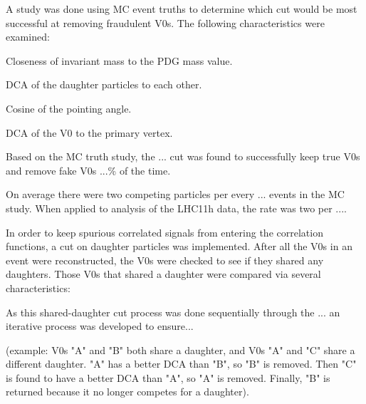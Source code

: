 A study was done using MC event truths to determine which cut would be most successful at removing fraudulent V0s.  The following characteristics were examined:

\item Closeness of invariant mass to the PDG mass value.
\item DCA of the daughter particles to each other.
\item Cosine of the pointing angle.
\item DCA of the V0 to the primary vertex.

Based on the MC truth study, the ... cut was found to successfully keep true V0s and remove fake V0s ...\% of the time.  

On average there were two competing particles per every ... events in the MC study.  When applied to analysis of the LHC11h data, the rate was two per ....

In order to keep spurious correlated signals from entering the correlation functions, a cut on daughter particles was implemented.  After all the V0s in an event were reconstructed, the V0s were checked to see if they shared any daughters.  Those V0s that shared a daughter were compared via several characteristics:

As this shared-daughter cut process was done sequentially through the ... an iterative process was developed to ensure... 

(example: V0s "A" and "B" both share a daughter, and V0s "A" and "C" share a different daughter.  "A" has a better DCA than "B", so "B" is removed.  Then "C" is found to have a better DCA than "A", so "A" is removed.  Finally, "B" is returned because it no longer competes for a daughter).

